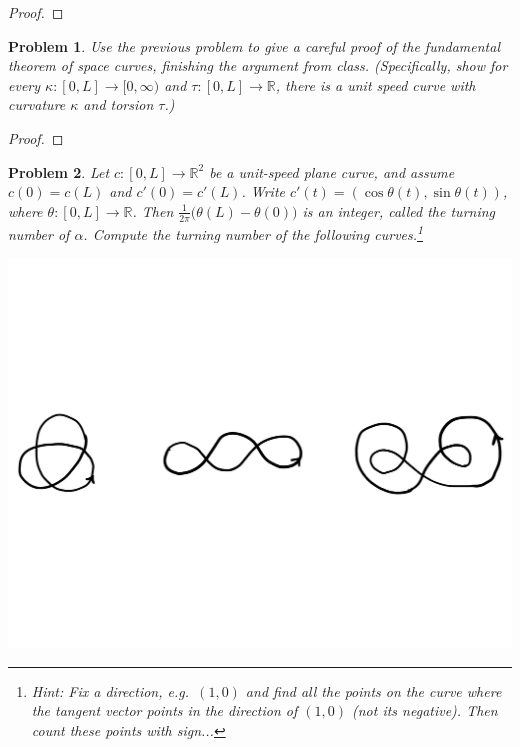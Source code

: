 \documentclass[11pt]{article}
\newtheorem{problem}{Problem}
\begin{document}
\begin{proof}

\end{proof}

\pagebreak


\begin{problem}
Use the previous problem to give a careful proof of the fundamental theorem of space curves, finishing the argument from class. (Specifically, show for every $\kappa:[0,L]\to[0,\infty)$ and $\tau:[0,L]\to\mathbb R$, there is a unit speed curve with curvature $\kappa$ and torsion $\tau$.) 
\end{problem}

\begin{proof}

\end{proof}

\pagebreak

\begin{problem}
Let $c:[0,L]\to\mathbb R^2$ be a unit-speed plane curve, and assume $c(0)=c(L)$ and $c'(0)=c'(L)$. Write $c'(t)=(\cos\theta(t),\sin\theta(t))$, where $\theta:[0,L]\to\mathbb R$. Then $\frac{1}{2\pi}\big(\theta(L)-\theta(0)\big)$ is an integer, called the turning number of $\alpha$. Compute the turning number of the following curves.\footnote{Hint: Fix a direction, e.g.\ $(1,0)$ and find all the points on the curve where the tangent vector points in the direction of $(1,0)$ (not its negative). Then count these points with sign...}
\begin{center}
\includegraphics[scale=.5]{tn.pdf}
\end{center}
\end{problem}
\end{document}
